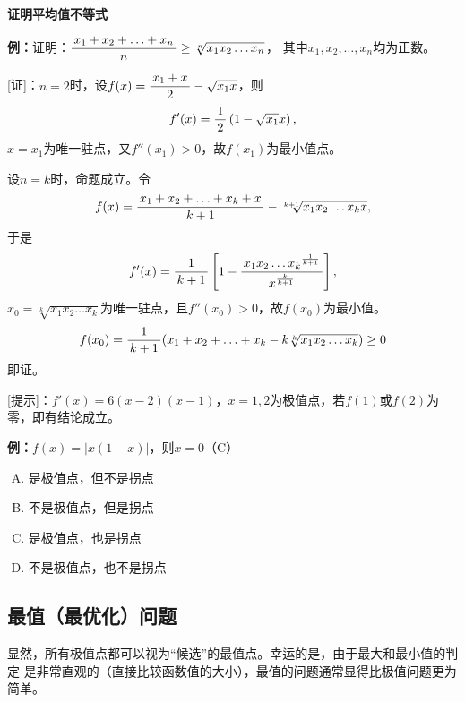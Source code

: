 \begin{shaded}
{\bf 证明平均值不等式}

{\bf 例：}证明：$\displaystyle\frac{\,{x_1+x_2+\ldots+x_n}\,}{\,{n}\,}\geq\sqrt[n]{x_1x_2\ldots x_n}$，
其中$x_1,x_2,\ldots,x_n$均为正数。

[证]：$n=2$时，设$f(x)=\displaystyle\frac{\,{x_1+x}\,}{\,{2}\,}-\sqrt{x_1x}$，则
$$f'(x)=\displaystyle\frac{\,{1}\,}{\,{2}\,}\left(1-\sqrt{x_1}x\right),$$
$x=x_1$为唯一驻点，又$f''(x_1)>0$，故$f(x_1)$为最小值点。

设$n=k$时，命题成立。令
$$f(x)=\displaystyle\frac{\,{x_1+x_2+\ldots+x_k+x}\,}{\,{k+1}\,}-\sqrt[k+1]{x_1x_2\ldots x_kx},$$
于是
$$f'(x)=\displaystyle\frac{\,{1}\,}{\,{k+1}\,}\left[1-\displaystyle\frac{\,{{x_1x_2\ldots x_k}^{\frac1{k+1}}}\,}{\,{x^{\frac k{k+1}}}\,}\right],$$
$x_0=\sqrt[k]{x_1x_2\ldots x_k}$为唯一驻点，且$f''(x_0)>0$，故$f(x_0)$为最小值。
$$f(x_0)=\displaystyle\frac{\,{1}\,}{\,{k+1}\,}(x_1+x_2+\ldots+x_k-k\sqrt[k]{x_1x_2\ldots x_k})\geq 0$$
即证。
\end{shaded}

% 

[提示]：$f'(x)=6(x-2)(x-1)$，$x=1,2$为极值点，若$f(1)$或$f(2)$为零，即有结论成立。

{\bf 例：}$f(x)=|x(1-x)|$，则$x=0$（C）
\begin{enumerate}[A)]
  \setlength{\itemindent}{1cm}
  \item 是极值点，但不是拐点
  \item 不是极值点，但是拐点
  \item 是极值点，也是拐点
  \item 不是极值点，也不是拐点
\end{enumerate}


\subsection{最值（最优化）问题}

显然，所有极值点都可以视为“候选”的最值点。幸运的是，由于最大和最小值的判定
是非常直观的（直接比较函数值的大小），最值的问题通常显得比极值问题更为简单。

